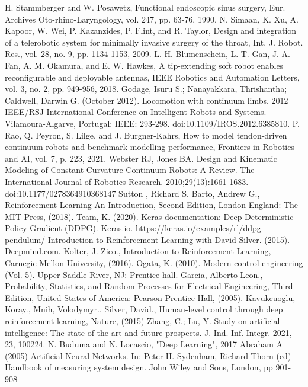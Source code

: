 \documentclass[12pt,twoside,a4]{mwbk}
\begin{document}
\begin{thebibliography}{9}
 H. Stammberger and W. Posawetz, Functional endoscopic sinus surgery, Eur. Archives Oto-rhino-Laryngology, vol. 247, pp. 63-76, 1990.
 N. Simaan, K. Xu, A. Kapoor, W. Wei, P. Kazanzides, P. Flint, and R. Taylor, Design and integration of a telerobotic system for minimally invasive surgery of the throat, Int. J. Robot. Res., vol. 28, no. 9, pp. 1134-1153, 2009.
 L. H. Blumenschein, L. T. Gan, J. A. Fan, A. M. Okamura, and E. W. Hawkes, A tip-extending soft robot enables reconfigurable and deployable antennas, IEEE Robotics and Automation Letters, vol. 3, no. 2, pp. 949-956, 2018.
 Godage, Isuru S.; Nanayakkara, Thrishantha; Caldwell, Darwin G. (October 2012). Locomotion with continuum limbs. 2012 IEEE/RSJ International Conference on Intelligent Robots and Systems. Vilamoura-Algarve, Portugal: IEEE: 293-298. doi:10.1109/IROS.2012.6385810.
 P. Rao, Q. Peyron, S. Lilge, and J. Burgner-Kahrs, How to model tendon-driven continuum robots and benchmark modelling performance, Frontiers in Robotics and AI, vol. 7, p. 223, 2021.
 Webster RJ, Jones BA. Design and Kinematic Modeling of Constant Curvature Continuum Robots: A Review. The International Journal of Robotics Research. 2010;29(13):1661-1683. doi:10.1177/0278364910368147
 Sutton , Richard S. Barto, Andrew G., Reinforcement Learning An Introduction, Second Edition, London England: The MIT Press, (2018).
 Team, K. (2020). Keras documentation: Deep Deterministic Policy Gradient (DDPG). Keras.io. https://keras.io/examples/rl/ddpg$\_$pendulum/
 Introduction to Reinforcement Learning with David Silver. (2015). Deepmind.com.
 Kolter, J. Zico., Introduction to Reinforcement Learning, Carnegie Mellon University, (2016).
 Ogata, K. (2010). Modern control engineering (Vol. 5). Upper Saddle River, NJ: Prentice hall.
 Garcia, Alberto Leon., Probability, Statistics, and Random Processes for Electrical Engineering, Third Edition, United States of America: Pearson Prentice Hall, (2005).
 Kavukcuoglu, Koray., Mnih, Volodymyr., Silver, David., Human-level control through deep reinforcement learning, Nature, (2015)
 Zhang, C.; Lu, Y. Study on artificial intelligence: The state of the art and future prospects. J. Ind. Inf. Integr. 2021, 23, 100224.
 N. Buduma and N. Locascio, "Deep Learning", 2017
 Abraham A (2005) Artificial Neural Networks. In: Peter H. Sydenham, Richard Thorn (ed) Handbook of measuring system design. John Wiley and Sons, London, pp 901-908

\end{thebibliography}
\end{document}
